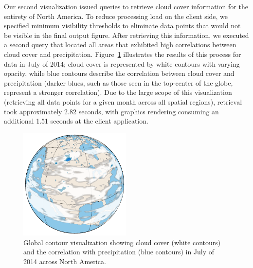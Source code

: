 Our second visualization issued queries to retrieve cloud cover information for the entirety of North America. To reduce processing load on the client side, we specified minimum visibility thresholds to eliminate data points that would not be visible in the final output figure. After retrieving this information, we executed a second query that located all areas that exhibited high correlations between cloud cover and precipitation. Figure~\ref{fig:global-contour} illustrates the results of this process for data in July of 2014; cloud cover is represented by white contours with varying opacity, while blue contours describe the correlation between cloud cover and precipitation (darker blues, such as those seen in the top-center of the globe, represent a stronger correlation). Due to the large scope of this visualization (retrieving all data points for a given month across all spatial regions), retrieval took approximately 2.82 seconds, with graphics rendering consuming an additional 1.51 seconds at the client application.
%
\begin{figure}[b]
    \centerline{\includegraphics[width=2.2in]{figures/globe.pdf}}
    \caption{Global contour visualization showing cloud cover (white contours) and the correlation with precipitation (blue contours) in July of 2014 across North America.}
    \label{fig:global-contour}
\end{figure}

